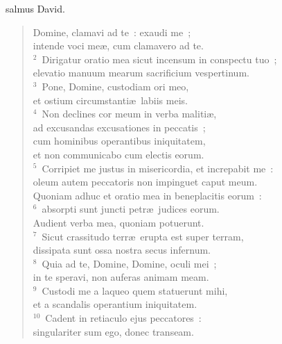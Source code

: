 \bchapter
{}salmus David. \begin{flushleft}\begin{verse}\vspace{6pt}Domine, clamavi ad te~: exaudi me~;\\ intende voci me\ae , cum clamavero ad te.\\
${}^{2}$~Dirigatur oratio mea sicut incensum in conspectu tuo~;\\ elevatio manuum mearum sacrificium vespertinum.\\
${}^{3}$~Pone, Domine, custodiam ori meo,\\ et ostium circumstanti\ae\ labiis meis.\\
${}^{4}$~Non declines cor meum in verba maliti\ae ,\\ ad excusandas excusationes in peccatis~;\\ cum hominibus operantibus iniquitatem,\\ et non communicabo cum electis eorum.\\
${}^{5}$~Corripiet me justus in misericordia, et increpabit me~:\\ oleum autem peccatoris non impinguet caput meum.\\ Quoniam adhuc et oratio mea in beneplacitis eorum~:\\
${}^{6}$~absorpti sunt juncti petr\ae\ judices eorum.\\ Audient verba mea, quoniam potuerunt.\\
${}^{7}$~Sicut crassitudo terr\ae\ erupta est super terram,\\ dissipata sunt ossa nostra secus infernum.\\
${}^{8}$~Quia ad te, Domine, Domine, oculi mei~;\\ in te speravi, non auferas animam meam.\\
${}^{9}$~Custodi me a laqueo quem statuerunt mihi,\\ et a scandalis operantium iniquitatem.\\
${}^{10}$~Cadent in retiaculo ejus peccatores~:\\ singulariter sum ego, donec transeam.\end{verse}\end{flushleft}



